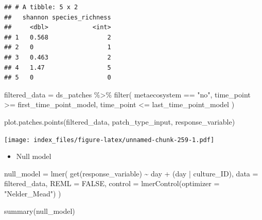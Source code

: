 \documentclass[
]{article}
\newenvironment{Shaded}{\begin{snugshade}}{\end{snugshade}}
\newcommand{\AttributeTok}[1]{\textcolor[rgb]{0.77,0.63,0.00}{#1}}
\newcommand{\ConstantTok}[1]{\textcolor[rgb]{0.00,0.00,0.00}{#1}}
\newcommand{\FunctionTok}[1]{\textcolor[rgb]{0.00,0.00,0.00}{#1}}
\newcommand{\NormalTok}[1]{#1}
\newcommand{\OtherTok}[1]{\textcolor[rgb]{0.56,0.35,0.01}{#1}}
\newcommand{\SpecialCharTok}[1]{\textcolor[rgb]{0.00,0.00,0.00}{#1}}
\newcommand{\StringTok}[1]{\textcolor[rgb]{0.31,0.60,0.02}{#1}}
\providecommand{\tightlist}{%
  \setlength{\itemsep}{0pt}\setlength{\parskip}{0pt}}
\begin{document}
\begin{verbatim}
## # A tibble: 5 x 2
##   shannon species_richness
##     <dbl>            <int>
## 1   0.568                2
## 2   0                    1
## 3   0.463                2
## 4   1.47                 5
## 5   0                    0
\end{verbatim}

\begin{Shaded}
\begin{Highlighting}[]
\NormalTok{filtered\_data }\OtherTok{=}\NormalTok{ ds\_patches }\SpecialCharTok{\%\textgreater{}\%}
  \FunctionTok{filter}\NormalTok{(}
\NormalTok{    metaecosystem }\SpecialCharTok{==} \StringTok{"no"}\NormalTok{,}
\NormalTok{    time\_point }\SpecialCharTok{\textgreater{}=}\NormalTok{ first\_time\_point\_model,}
\NormalTok{    time\_point }\SpecialCharTok{\textless{}=}\NormalTok{ last\_time\_point\_model}
\NormalTok{  )}
\end{Highlighting}
\end{Shaded}

\begin{Shaded}
\begin{Highlighting}[]
\FunctionTok{plot.patches.points}\NormalTok{(filtered\_data,}
\NormalTok{                    patch\_type\_input,}
\NormalTok{                    response\_variable)}
\end{Highlighting}
\end{Shaded}

\texttt{[image: index\_files/figure-latex/unnamed-chunk-259-1.pdf]}

\begin{itemize}
\tightlist
\item
  Null model
\end{itemize}

\begin{Shaded}
\begin{Highlighting}[]
\NormalTok{null\_model }\OtherTok{=} \FunctionTok{lmer}\NormalTok{(}
  \FunctionTok{get}\NormalTok{(response\_variable) }\SpecialCharTok{\textasciitilde{}}
\NormalTok{    day }\SpecialCharTok{+}
\NormalTok{    (day }\SpecialCharTok{|}\NormalTok{ culture\_ID),}
  \AttributeTok{data =}\NormalTok{ filtered\_data,}
  \AttributeTok{REML =} \ConstantTok{FALSE}\NormalTok{,}
  \AttributeTok{control =} \FunctionTok{lmerControl}\NormalTok{(}\AttributeTok{optimizer =} \StringTok{"Nelder\_Mead"}\NormalTok{)}
\NormalTok{)}

\FunctionTok{summary}\NormalTok{(null\_model)}
\end{Highlighting}
\end{Shaded}
\end{document}
